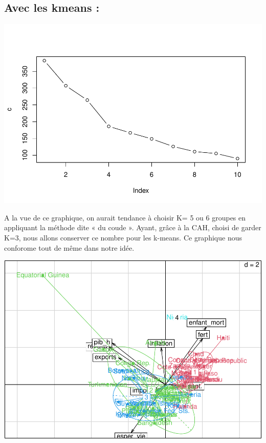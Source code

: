 \documentclass[
]{article}
\newenvironment{Shaded}{}{}
\newcommand{\AttributeTok}[1]{#1}
\newcommand{\DecValTok}[1]{#1}
\newcommand{\FunctionTok}[1]{#1}
\newcommand{\NormalTok}[1]{#1}
\newcommand{\OtherTok}[1]{\textcolor[rgb]{1.00,0.25,0.00}{#1}}
\newcommand{\SpecialCharTok}[1]{\textcolor[rgb]{0.00,0.50,0.50}{#1}}
\begin{document}
\hypertarget{avec-les-kmeans}{%
\subsection{Avec les kmeans :}\label{avec-les-kmeans}}

\includegraphics{Projet_files/figure-latex/unnamed-chunk-38-1.pdf}

A la vue de ce graphique, on aurait tendance à choisir K= 5 ou 6 groupes
en appliquant la méthode dite « du coude ». Ayant, grâce à la CAH,
choisi de garder K=3, nous allons conserver ce nombre pour les k-means.
Ce graphique nous conforome tout de même dans notre idée.

\begin{Shaded}
\end{Shaded}

\includegraphics{Projet_files/figure-latex/unnamed-chunk-39-1.pdf}
\end{document}
